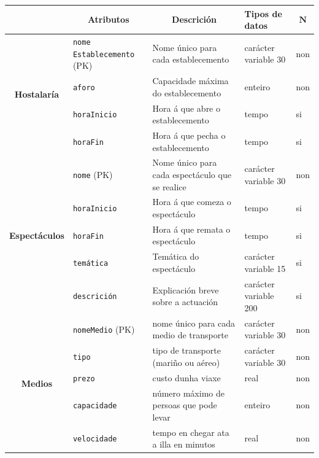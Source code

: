 \documentclass[12pt,a4paper]{book}
\theoremstyle{definition}
\theoremstyle{break}
\begin{document}
	\newpage
	
	
	\begin{table} [H] \centering
		\begin{tabular}{|c|m{3cm}|m{4cm}|m{2cm}|m{0.7cm}|}
			\hline \rowcolor{gris}
			\multicolumn{1}{|m{2.5cm}|}{Entidade ou relación} & \multicolumn{1}{c|}{Atributos} & \multicolumn{1}{c|}{Descrición} & \multicolumn{1}{m{2cm}|}{Tipos de datos} & \multicolumn{1}{c|}{$\mathbf{N}$} \\
			\hline
			\multirow{4}{*}{\textbf{Hostalaría}} & \texttt{nome Establecemento} (PK) & Nome único para cada establecemento &  carácter \textcolor{white}{aa} variable 30 & non \\
			\cline{2-5}
			& \texttt{aforo} & Capacidade máxima do establecemento & enteiro & non \\
			\cline{2-5}
			& \texttt{horaInicio} & Hora á que abre o establecemento & tempo & si \\
			\cline{2-5}
			& \texttt{horaFin} & Hora á que pecha o establecemento & tempo & si \\
			\hline
			\multirow{5}{*}{\textbf{Espectáculos}} & \texttt{nome} (PK) & Nome único para cada espectáculo que se realice &  carácter \textcolor{white}{aa} variable 30 & non \\
			\cline{2-5}
			& \texttt{horaInicio} & Hora á que comeza o espectáculo & tempo & si \\
			\cline{2-5}
			& \texttt{horaFin} & Hora á que remata o espectáculo & tempo & si \\
			\cline{2-5}
			& \texttt{temática} & Temática do espectáculo &  carácter \textcolor{white}{aa} variable 15 & si \\
			\cline{2-5}
			& \texttt{descrición} & Explicación breve sobre a actuación &  carácter \textcolor{white}{aa} variable 200 & si \\
			\hline
			\multirow{5}{*}{\textbf{Medios}} & \texttt{nomeMedio} (PK) & nome único para cada medio de transporte &  carácter \textcolor{white}{aa} variable 30 & non\\
			\cline{2-5}
			& \texttt{tipo} & tipo de transporte (mariño ou aéreo) &  carácter \textcolor{white}{aa} variable 30 & non\\
			\cline{2-5}
			&\texttt{prezo} & custo dunha viaxe & real & non\\
			\cline{2-5}
			&\texttt{capacidade} & número máximo de persoas que pode levar & enteiro & non\\
			\cline{2-5}
			&\texttt{velocidade} & tempo en chegar ata a illa en minutos & real & non\\
			\hline
		\end{tabular}
	\end{table}
	
\end{document}
